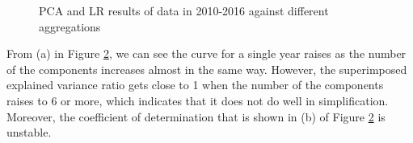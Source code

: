 \documentclass{mcmthesis}
\begin{document}
\begin{figure}[H]
\begin{subfigure}[b]{0.48\textwidth}
        \label{fig:pca_year_score}
    \end{subfigure}
    \caption{PCA and LR results of data in 2010-2016 against different aggregations}\label{fig:pca_year}
\end{figure}

From (a) in Figure \ref{fig:pca_year}, we can see the curve for a single year raises as the number of the components increases almost in the same way. However, the superimposed explained variance ratio gets close to 1 when the number of the components raises to 6 or more, which indicates that it does not do well in simplification. Moreover, the coefficient of determination that is shown in (b) of Figure \ref{fig:pca_year} is unstable.

~\smallskip
\end{document}
